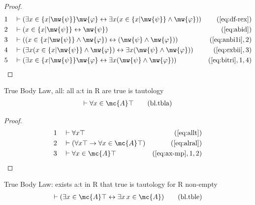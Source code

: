 \begin{proof}
\begin{align}
  1 &&  & \vdash ( \exists x \in \{ x \vert \mw{\psi} \} \mw{\varphi}
     \leftrightarrow \exists x ( x \in \{ x \vert \mw{\psi} \}
     \wedge \mw{\varphi} )
     )&(\mbox{\ref{eq:df-rex}})\notag
  \\ 2 &&  & \vdash ( x \in \{ x \vert \mw{\psi} \} \leftrightarrow \mw{\psi}
     )&(\mbox{\ref{eq:abid}})\notag
  \\ 3 &&  & \vdash ( ( x \in \{ x \vert \mw{\psi} \} \wedge \mw{\varphi} )
     \leftrightarrow ( \mw{\psi} \wedge \mw{\varphi} )
     )&(\mbox{\ref{eq:anbi1i}},2)\notag
  \\ 4 &&  & \vdash ( \exists x ( x \in \{ x \vert \mw{\psi} \} \wedge \mw{\varphi}
     ) \leftrightarrow \exists x ( \mw{\psi} \wedge
     \mw{\varphi} ) )&(\mbox{\ref{eq:exbii}},3)\notag
  \\ 5 &&  & \vdash ( \exists x \in \{ x \vert \mw{\psi} \} \mw{\varphi}
     \leftrightarrow \exists x ( \mw{\psi} \wedge
     \mw{\varphi} ) )&(\mbox{\ref{eq:bitri}},1,4)\notag
\end{align}
\end{proof}


\begin{lemma} {True Body Law, all}: all a:t in R are true
is tautology
\begin{align}
\vdash \forall x \in \mc{A} \top\label{eq:bl.tbla}\tag{bl.tbla}
\end{align}
\end{lemma}

\begin{proof}
\begin{align}
  1 &&  & \vdash \forall x \top&(\mbox{\ref{eq:allt}})\notag
  \\ 2 &&  & \vdash ( \forall x \top \rightarrow \forall x \in \mc{A} \top
    )&(\mbox{\ref{eq:alral}})\notag
  \\ 3 &&  & \vdash \forall x \in \mc{A} \top&(\mbox{\ref{eq:ax-mp}},1,2)\notag
\end{align}
\end{proof}

\begin{lemma} {True Body Law: exists} a:t in R that true is
tautology for R non-empty
\begin{align}
\vdash ( \exists x \in \mc{A} \top \leftrightarrow \exists x \,x \in \mc{A} 
    )\label{eq:bl.tble}\tag{bl.tble}
\end{align}
\end{lemma}

